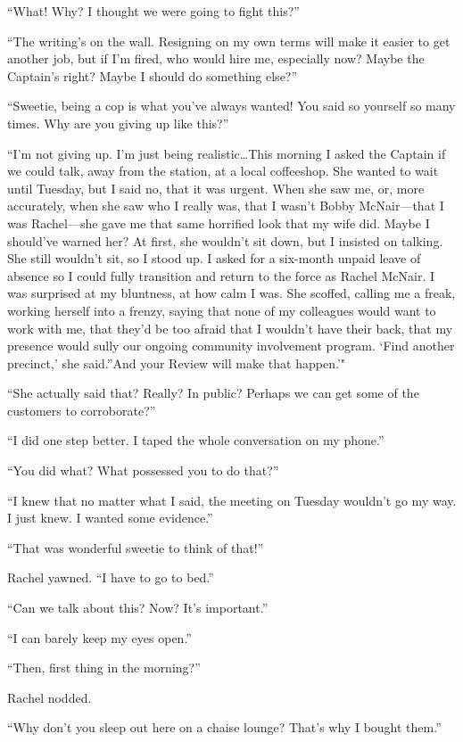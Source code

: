 ``What! Why? I thought we were going to fight this?''

``The writing's on the wall. Resigning on my own terms will make it
easier to get another job, but if I'm fired, who would hire me,
especially now? Maybe the Captain's right? Maybe I should do something
else?''

``Sweetie, being a cop is what you've always wanted! You said so
yourself so many times. Why are you giving up like this?''

``I'm not giving up. I'm just being realistic\ldots This morning I asked
the Captain if we could talk, away from the station, at a local
coffeeshop. She wanted to wait until Tuesday, but I said no, that it was
urgent. When she saw me, or, more accurately, when she saw who I really
was, that I wasn't Bobby McNair---that I was Rachel---she gave me that
same horrified look that my wife did. Maybe I should've warned her? At
first, she wouldn't sit down, but I insisted on talking. She still
wouldn't sit, so I stood up. I asked for a six-month unpaid leave of
absence so I could fully transition and return to the force as Rachel
McNair. I was surprised at my bluntness, at how calm I was. She scoffed,
calling me a freak, working herself into a frenzy, saying that none of
my colleagues would want to work with me, that they'd be too afraid that
I wouldn't have their back, that my presence would sully our ongoing
community involvement program. `Find another precinct,' she said.''And
your Review will make that happen.'"

``She actually said that? Really? In public? Perhaps we can get some of
the customers to corroborate?''

``I did one step better. I taped the whole conversation on my phone.''

``You did what? What possessed you to do that?''

``I knew that no matter what I said, the meeting on Tuesday wouldn't go
my way. I just knew. I wanted some evidence.''

``That was wonderful sweetie to think of that!''

Rachel yawned. ``I have to go to bed.''

``Can we talk about this? Now? It's important.''

``I can barely keep my eyes open.''

``Then, first thing in the morning?''

Rachel nodded.

``Why don't you sleep out here on a chaise lounge? That's why I bought
them.''

